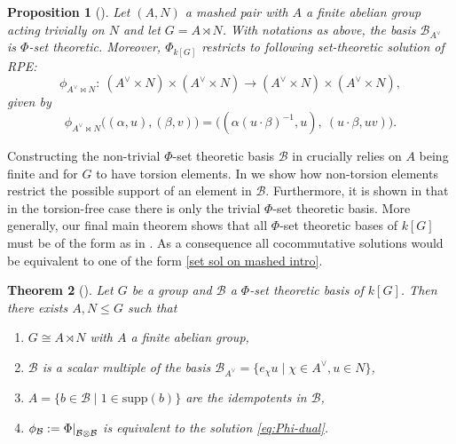 \documentclass[a4paper,10pt]{amsart}
\newtheorem{maintheorem}{Theorem}
\newtheorem{mainproposition}[maintheorem]{Proposition}
\theoremstyle{definition}
\theoremstyle{remark}
\newcommand{\Supp}{\mathrm{supp}}
\newcommand\ot{\otimes}
\newcommand\mc{\mathcal}
\newcommand\restr[2]{{%
   \left.\kern-\nulldelimiterspace %
   #1 %
   \right|_{#2} %
   }}
\begin{document}
\begin{mainproposition}[]\label{main th sol from mashed}
Let $(A,N)$ a mashed pair with $A$ a finite abelian group acting trivially on $N$ and let $G = A \rtimes N$. With notations as above, the basis $\mathcal{B}_{A^\vee}$ is $\Phi$-set theoretic. Moreover, $\Phi_{k[G]}$ restricts to following set-theoretic solution of RPE:
\[
\phi_{A^\vee\bowtie N}:\ (A^\vee\times N)\times(A^\vee\times N)\to (A^\vee\times N)\times(A^\vee\times N),
\]
given by
\begin{equation}\label{set sol on mashed intro}
\phi_{A^\vee\bowtie N}\bigl((\alpha,u),(\beta,v)\bigr)
=
\bigl((\alpha(u\cdot\beta)^{-1},u),\ (u\cdot\beta,uv)\bigr).
\end{equation}
\end{mainproposition}

Constructing the non-trivial $\Phi$-set theoretic basis $\mc{B}$ in  crucially relies on $A$ being finite and for $G$ to have torsion elements. In  we show how non-torsion elements restrict the possible support of an element in $\mc{B}$. Furthermore, it is shown in  that in the torsion-free case there is only the trivial $\Phi$-set theoretic basis. More generally, our final main theorem shows that all $\Phi$-set theoretic bases of $k[G]$ must be of the form as in . As a consequence all cocommutative solutions would be equivalent to one of the form \eqref{set sol on mashed intro}.

\begin{maintheorem}[]\label{reconstructino theorem intro}
Let $G$ be a group and $\mc{B}$ a $\Phi$-set theoretic basis of $k[G]$. Then there exists $A,N \leq G$ such that
\begin{enumerate}
    \item $G \cong A \rtimes N$ with $A$ a finite abelian group,
    \item $\mc{B}$ is a scalar multiple of the basis $\mc{B}_{A^{\vee}}= \{ e_{\chi} u \mid  \chi \in A^{\vee}, u \in N\}$,
    \item $A= \{ b\in \mc{B} \mid 1 \in \Supp(b) \}$ are the idempotents in $\mc{B}$,
    \item $\phi_{\mc{B}} := \restr{\Phi}{\mc{B} \ot \mc{B}}$ is equivalent to the solution \eqref{eq:Phi-dual}.
\end{enumerate}
\end{maintheorem}
\end{document}
